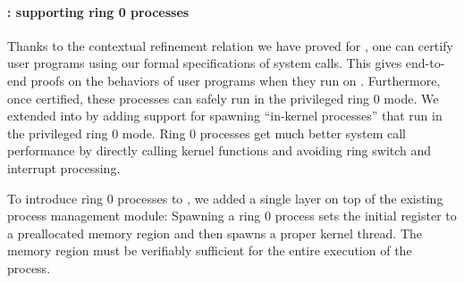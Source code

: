 
\paragraph{\mCTOSringz{}: supporting ring 0 processes}

Thanks to the contextual refinement relation we have proved for
\mCTOSbase{}, one can certify user programs using our formal
specifications of system calls. This gives end-to-end proofs on
the behaviors of user programs when they run on \mCTOSbase{}.  
Furthermore, once certified, these processes can safely run in
the privileged ring 0 mode.  We extended \mCTOSbase{} into
\mCTOSringz{} by adding support for spawning ``in-kernel
processes'' that run in the privileged ring 0 mode. 
Ring 0 processes get much
better system call performance by directly calling kernel
functions and avoiding ring switch and interrupt processing. 

To introduce ring 0 processes to \mCTOSbase{},
we added a single layer on top of the existing process management module:
Spawning a ring 0 process sets the initial  register to a
preallocated memory region and then spawns a proper kernel thread. The
memory region must be verifiably sufficient for the entire execution
of the process. 

